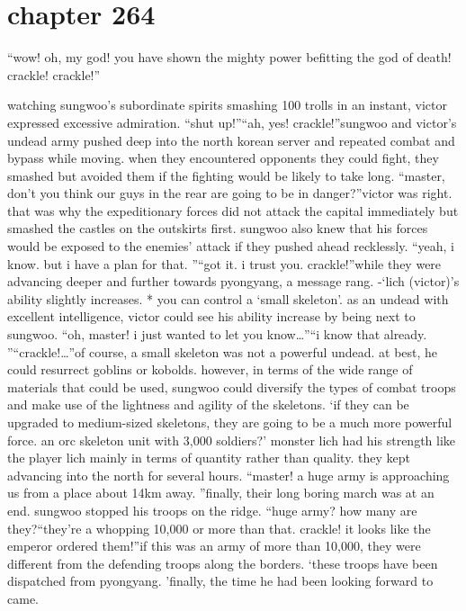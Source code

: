 \section{chapter 264}

                            “wow! oh, my god! you have shown the mighty power befitting the god of death! crackle! crackle!”




watching sungwoo’s subordinate spirits smashing 100 trolls in an instant, victor expressed excessive admiration.
“shut up!”“ah, yes! crackle!”sungwoo and victor’s undead army pushed deep into the north korean server and repeated combat and bypass while moving.
 when they encountered opponents they could fight, they smashed but avoided them if the fighting would be likely to take long.
“master, don’t you think our guys in the rear are going to be in danger?”victor was right.
 that was why the expeditionary forces did not attack the capital immediately but smashed the castles on the outskirts first.
sungwoo also knew that his forces would be exposed to the enemies’ attack if they pushed ahead recklessly.
“yeah, i know.
 but i have a plan for that.
”“got it.
 i trust you.
 crackle!”while they were advancing deeper and further towards pyongyang, a message rang.
-‘lich (victor)’s ability slightly increases.
* you can control a ‘small skeleton’.
as an undead with excellent intelligence, victor could see his ability increase by being next to sungwoo.
“oh, master! i just wanted to let you know…”“i know that already.
”“crackle!…”of course, a small skeleton was not a powerful undead.
 at best, he could resurrect goblins or kobolds.
 however, in terms of the wide range of materials that could be used, sungwoo could diversify the types of combat troops and make use of the lightness and agility of the skeletons.
‘if they can be upgraded to medium-sized skeletons, they are going to be a much more powerful force.
 an orc skeleton unit with 3,000 soldiers?’
monster lich had his strength like the player lich mainly in terms of quantity rather than quality.
they kept advancing into the north for several hours.
“master! a huge army is approaching us from a place about 14km away.
”finally, their long boring march was at an end.
sungwoo stopped his troops on the ridge.
“huge army? how many are they?“they’re a whopping 10,000 or more than that.
 crackle! it looks like the emperor ordered them!”if this was an army of more than 10,000, they were different from the defending troops along the borders.
‘these troops have been dispatched from pyongyang.
’finally, the time he had been looking forward to came.
